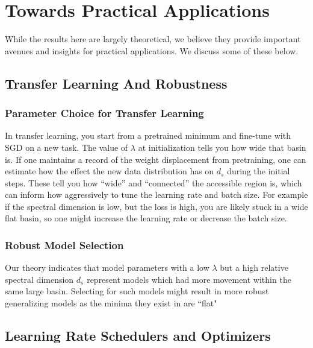 \documentclass{article} %
\theoremstyle{definition}
\begin{document}

\section{Towards Practical Applications}\label{app:practical_applications}
While the results here are largely theoretical, we believe they provide important avenues and insights for practical applications. We discuss some of these below.

\subsection{Transfer Learning And Robustness}
\subsubsection{Parameter Choice for Transfer Learning}
In transfer learning, you start from a pretrained minimum and fine-tune with SGD on a new task. The value of $\lambda$ at initialization tells you how wide that basin is. If one maintains a record of the weight displacement from pretraining, one can estimate how the effect the new data distribution has on $d_s$ during the initial steps. These tell you how “wide” and “connected” the accessible region is, which can inform how aggressively to tune the learning rate and batch size. For example if the spectral dimension is low, but the loss is high, you are likely stuck in a wide flat basin, so one might increase the learning rate or decrease the batch size.

\subsubsection{Robust Model Selection}
Our theory indicates that model parameters with a low $\lambda$ but a high relative spectral dimension $d_s$ represent models which had more movement within the same large basin. Selecting for such models might result in more robust generalizing models as the minima they exist in are ``flat"

\subsection{Learning Rate Schedulers and Optimizers}
\end{document}
